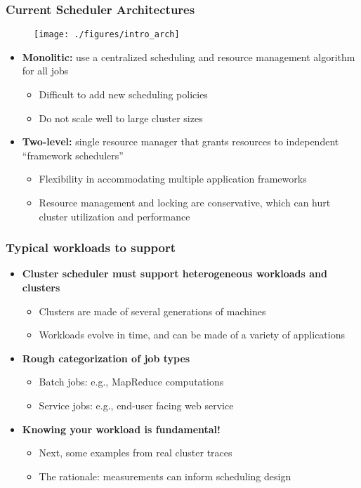 \begin{frame}\frametitle{Current Scheduler Architectures}
\begin{figure}[h]
  \centering
  \texttt{[image: ./figures/intro\_arch]}
  \label{fig:intro_arch}
\end{figure}
\begin{itemize}
	\item {\bf Monolitic:} use a centralized scheduling and resource management algorithm for all jobs
	\begin{itemize}
		\item Difficult to add new scheduling policies
		\item Do not scale well to large cluster sizes
	\end{itemize}
	
\vspace{10pt}

	\item {\bf Two-level:} single resource manager that grants resources to independent ``framework schedulers''
	\begin{itemize}
		\item Flexibility in accommodating multiple application frameworks
		\item Resource management and locking are conservative, which can hurt cluster utilization and performance
	\end{itemize}
\end{itemize}
\end{frame}

\begin{frame}\frametitle{Typical workloads to support}
\begin{itemize}
	\item {\bf Cluster scheduler must support heterogeneous workloads and clusters}
	\begin{itemize}
		\item Clusters are made of several generations of machines
		\item Workloads evolve in time, and can be made of a variety of applications
	\end{itemize}

\vspace{10pt}

	\item {\bf Rough categorization of job types}
	\begin{itemize}
		\item Batch jobs: e.g., MapReduce computations
		\item Service jobs: e.g., end-user facing web service
	\end{itemize}

\vspace{10pt}

	\item {\bf Knowing your workload is fundamental!}
	\begin{itemize}
		\item Next, some examples from real cluster traces
		\item The rationale: measurements can inform scheduling design
	\end{itemize}
\end{itemize}
\end{frame}

